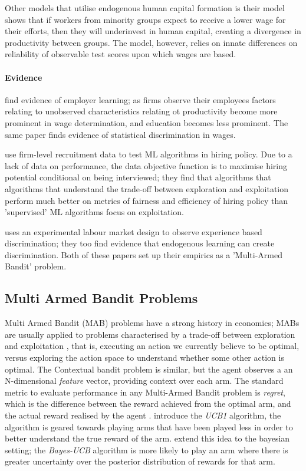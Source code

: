\documentclass[]{article}
\begin{document}
Other models that utilise endogenous human capital formation is \citet{LunderbergStartz1983} their model shows that if workers from minority groups expect to receive a lower wage for their efforts, then they will underinvest in human capital, creating a divergence in productivity between groups. The model, however, relies on innate differences on reliability of observable test scores upon which wages are based.	

\paragraph{Evidence}

\citet{AltonjiPierret2001} find evidence of employer learning; as firms observe their employees factors relating to unobserved characteristics relating ot productivity become more prominent in wage determination, and education becomes less prominent. The same paper finds evidence of statistical discrimination in wages.

\citet{LiRaymondBergman2020} use firm-level recruitment data to test ML algorithms in hiring policy. Due to a lack of data on performance, the data objective function is to maximise hiring potential conditional on being interviewed; they find that algorithms that algorithms that understand the trade-off between exploration and exploitation perform much better on metrics of fairness and efficiency of hiring policy than 'supervised' ML algorithms focus on exploitation.

\citet{Lepage2024} uses an experimental labour market design to observe experience based discrimination; they too find evidence that endogenous learning can create discrimination.
Both of these papers set up their empirics as a 'Multi-Armed Bandit' problem.



\subsection{Multi Armed Bandit Problems}

Multi Armed Bandit (MAB) problems have a strong history in economics; MABs are usually applied to problems characterised by a trade-off between exploration and exploitation \citep{BergemannValimaki2006}, that is, executing an action we currently believe to be optimal, versus exploring the action space to understand whether some other action is optimal.
The Contextual bandit problem is similar, but the agent observes a an N-dimensional \textit{feature} vector, providing context over each arm.
The standard metric to evaluate performance in any Multi-Armed Bandit problem is \textit{regret}, which is the difference between the reward achieved from the optimal arm, and the actual reward realised by the agent \citep{Slivkins2011}.
\citet{AuerCesaBianchiFischer2002} introduce the \textit{UCB1} algorithm, the algorithm is geared towards playing arms that have been played less in order to better understand the true reward of the arm. \citet{kaufmann2012} extend this idea to the bayesian setting; the \textit{Bayes-UCB} algorithm is more likely to play an arm where there is greater uncertainty over the posterior distribution of rewards for that arm.
\end{document}

